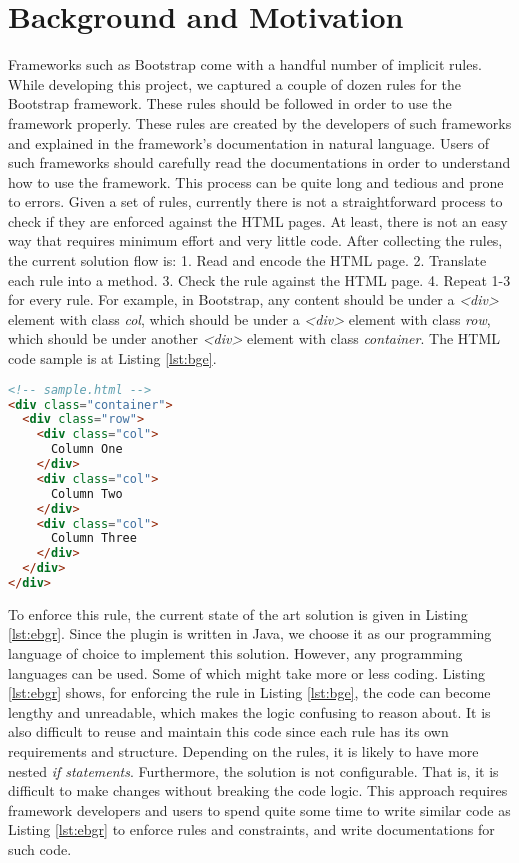 \documentclass[conference]{IEEETran}
\begin{document}
\section{Background and Motivation}

Frameworks such as Bootstrap come with a handful number of implicit rules. While developing this project, we captured a couple of dozen rules for the Bootstrap framework. These rules should be followed in order to use the framework properly. These rules are created by the developers of such frameworks and explained in the framework’s documentation in natural language. Users of such frameworks should carefully read the documentations in order to understand how to use the framework. This process can be quite long and tedious and prone to errors. Given a set of rules, currently there is not a straightforward process to check if they are enforced against the HTML pages. At least, there is not an easy way that requires minimum effort and very little code. After collecting the rules, the current solution flow is:
1. Read and encode the HTML page. 
2. Translate each rule into a method. 
3. Check the rule against the HTML page.
4. Repeat 1-3 for every rule.
For example, in Bootstrap, any content should be under a \textit{<div>} element with class \textit{col}, which should be under a \textit{<div>} element with class \textit{row}, which should be under another \textit{<div>} element with class \textit{container}. The HTML code sample is at Listing \ref{lst:bge}.  

\begin{lstlisting}[language=HTML, caption=Bootstrap Grid Example, label={lst:bge}]
<!-- sample.html -->
<div class="container">
  <div class="row">
    <div class="col">
      Column One
    </div>
    <div class="col">
      Column Two
    </div>
    <div class="col">
      Column Three
    </div>
  </div>
</div>
\end{lstlisting}

To enforce this rule, the current state of the art solution is given in Listing \ref{lst:ebgr}. Since the plugin is written in Java, we choose it as our programming language of choice to implement this solution. However, any programming languages can be used. Some of which might take more or less coding. Listing \ref{lst:ebgr} shows, for enforcing the rule in Listing \ref{lst:bge}, the code can become lengthy and unreadable, which makes the logic confusing to reason about. It is also difficult to reuse and maintain this code since each rule has its own requirements and structure. Depending on the rules, it is likely to have more nested \textit{if statements}. Furthermore, the solution is not configurable. That is, it is difficult to make changes without breaking the code logic. This approach requires framework developers and users to spend quite some time to write similar code as Listing \ref{lst:ebgr} to enforce rules and constraints, and write documentations for such code.   
\end{document}
